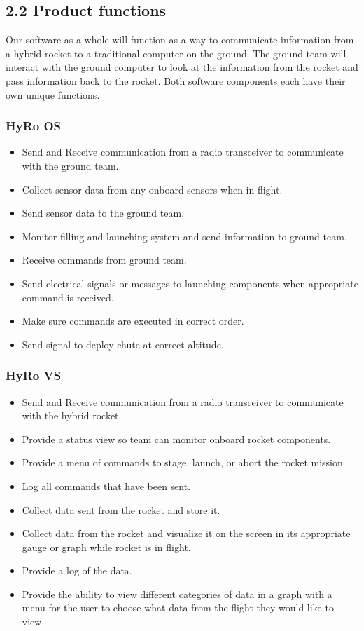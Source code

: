 \documentclass[10pt,draftclsnofoot,onecolumn]{IEEEtran}
\begin{document}
\subsection{2.2 Product functions}
Our software as a whole will function as a way to communicate information from a hybrid rocket to a traditional computer on the ground. The ground team will interact with the ground computer to look at the information from the rocket and pass information back to the rocket. Both software components each have their own unique functions.
\subsubsection{HyRo OS}
\begin{itemize}
\item Send and Receive communication from a radio transceiver to communicate with the ground team.
\item Collect sensor data from any onboard sensors when in flight.
\item Send sensor data to the ground team.
\item Monitor filling and launching system and send information to ground team.
\item Receive commands from ground team.
\item Send electrical signals or messages to launching components when appropriate command is received.
\item Make sure commands are executed in correct order.
\item Send signal to deploy chute at correct altitude.
\end{itemize}

\subsubsection{HyRo VS}
\begin{itemize}
\item Send and Receive communication from a radio transceiver to communicate with the hybrid rocket.
\item Provide a status view so team can monitor onboard rocket components.
\item Provide a menu of commands to stage, launch, or abort the rocket mission.
\item Log all commands that have been sent.
\item Collect data sent from the rocket and store it.
\item Collect data from the rocket and visualize it on the screen in its appropriate gauge or graph while rocket is in flight.
\item Provide a log of the data.
\item Provide the ability to view different categories of data in a graph with a menu for the user to choose what data from the flight they would like to view.\end{itemize}
\end{document}
